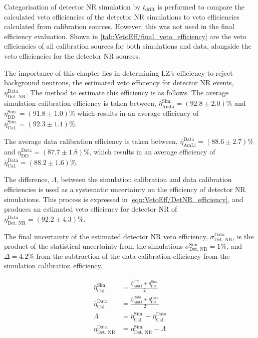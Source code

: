 Categorisation of detector NR simulation by $t_{\text{drift}}$ is performed to compare the calculated veto efficiencies of the detector NR simulations to veto efficiencies calculated from calibration sources. However, this was not used in the final efficiency evaluation. Shown in \autoref{tab:VetoEff/final_veto_efficiency} are the veto efficiencies of all calibration sources for both simulations and data, alongside the veto efficiencies for the detector NR sources.

The importance of this chapter lies in determining LZ's efficiency to reject background neutrons, the estimated veto efficiency for detector NR events, $\eta_{\text{Det. NR}}^{\text{Data}}$. The method to estimate this efficiency is as follows. 
The average simulation calibration efficiency is taken between, $\overline{\eta}_{\text{AmLi}}^{\text{Sim.}}=(92.8\pm2.0)\%$ and $\eta_{\text{DD}}^{\text{Sim.}}=(91.8\pm1.0)\%$ which results in an average efficiency of $\overline{\eta}_{\text{Cal.}}^{\text{Sim.}}=(92.3\pm1.1)\%$.

The average data calibration efficiency is taken between, $\overline{\eta}_{\text{AmLi}}^{\text{Data}}=(88.6\pm2.7)\%$ and $\eta_{\text{DD}}^{\text{Data}}=(87.7\pm1.8)\%$, which results in an average efficiency of $\overline{\eta}_{\text{Cal.}}^{\text{Data}}=(88.2\pm1.6)\%$.

The difference, $\Lambda$, between the simulation calibration and data calibration efficiencies is used as a systematic uncertainty on the efficiency of detector NR simulations. This process is expressed in \autoref{eqn:VetoEff/DetNR_efficiency}, and produces an estimated veto efficiency for detector NR of $\eta_{\text{Det. NR}}^\text{Data}=(92.2\pm4.3)\%$.

The final uncertainty of the estimated detector NR veto efficiency, $\sigma^\text{Data}_\text{Det. NR}$, is the product of the statistical uncertainty from the simulations $\sigma^\text{Sim.}_\text{Det. NR}=1\%$, and $\Delta=4.2\%$ from the subtraction of the data calibration efficiency from the simulation calibration efficiency.

\begin{equation}
    \label{eqn:VetoEff/DetNR_efficiency}
    \begin{split}
    	\overline{\eta}_{\text{Cal.}}^{\text{Sim.}} & = \frac{\overline{\eta}_{\text{AmLi}}^{\text{Sim.}}+\eta_{\text{DD}}^{\text{Sim.}}}{2}\\
    	\overline{\eta}_{\text{Cal.}}^{\text{Data}} & = \frac{\overline{\eta}_{\text{AmLi}}^{\text{Data}}+\eta_{\text{DD}}^{\text{Data}}}{2} \\
    	\Lambda &= \overline{\eta}_{\text{Cal.}}^{\text{Sim.}} - \overline{\eta}_{\text{Cal.}}^{\text{Data}}\\
    	\eta_\text{Det. NR}^\text{Data}   & = \eta_\text{Det. NR}^\text{Sim.} - \Lambda
    \end{split}
\end{equation}

